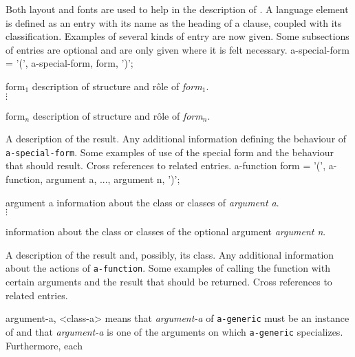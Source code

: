 %
\begin{optDefinition}
Both layout and fonts are used to help in the description of \eulisp.
A language element is defined as an entry with its name as the heading of a
clause, coupled with its classification.  Examples of several kinds of
entry are now given.  Some subsections of entries are optional and are
only given where it is felt necessary.
%
\Syntax
\label{a-special-form-syntax}
\savesyntax\aspecialformSyntax\vbox{\syntax
a-special-form
    = '(', a-special-form, {form}, ')';
\endsyntax}
%
\begin{arguments}
    \item[form$_1$] description of structure and r\^ole of {\em form$_1$}.\\
    $\vdots$
    \item[form$_n$] description of structure and r\^ole of {\em form$_n$}.
\end{arguments}
%
\result%
A description of the result.
%
\remarks%
Any additional information defining the behaviour of {\tt
    a-special-form}.
%
\examples
Some examples of use of the special form and the behaviour that should
result.
%
\seealso%
Cross references to related entries.
%
%
\Syntax
\label{a-function-syntax}
\savesyntax\aFunctionSyntax\vbox{\syntax
a-function form
   = '(', a-function, argument a, ..., argument n, ')';
\endsyntax}
%
\begin{arguments}
    \item[argument a] information about the class or classes of {\em
        argument a}.\\
    $\vdots$
    \item[\optional{argument n}] information about the class or classes of
    the optional argument {\em argument n}.
\end{arguments}
%
\result%
A description of the result and, possibly, its class.
%
\remarks%
Any additional information about the actions of {\tt a-function}.
%
\examples
Some examples of calling the function with certain arguments and the
result that should be returned.
%
\seealso%
Cross references to related entries.
%
%
\begin{genericargs}
    \item[argument-a, <class-a>] means that {\em argument-a} of {\tt a-generic}
    must be an instance of {\tt <class-a>} and that {\em argument-a} is one of
    the arguments on which {\tt a-generic} specializes.  Furthermore, each

\end{genericargs}
\end{optDefinition}
